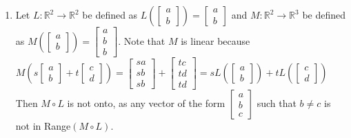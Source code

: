 \documentclass[10pt,english]{article}
\begin{document}
\begin{enumerate}
\begin{enumerate}
    \item Let $L:\mathbb{R}^2\rightarrow\mathbb{R}^2$ be defined as $L\left(\begin{bmatrix}a\\b\end{bmatrix}\right)=\begin{bmatrix}a\\b\end{bmatrix}$ and $M:\mathbb{R}^2\rightarrow\mathbb{R}^3$ be defined as $M\left(\begin{bmatrix}a\\b\end{bmatrix}\right)=\begin{bmatrix}a\\b\\b\end{bmatrix}$. 
    Note that $M$ is linear because $M\left(s\begin{bmatrix}a\\b\end{bmatrix}+t\begin{bmatrix}c\\d\end{bmatrix}\right)=\begin{bmatrix}sa\\sb\\sb\end{bmatrix}+\begin{bmatrix}tc\\td\\td\end{bmatrix}=sL\left(\begin{bmatrix}a\\b\end{bmatrix}\right)+tL\left(\begin{bmatrix}c\\d\end{bmatrix}\right)$
    Then $M\circ L$ is not onto, as any vector of the form $\begin{bmatrix}a\\b\\c\end{bmatrix}$ such that $b\neq c$ is not in Range$(M\circ L)$. 
\end{enumerate}




\end{enumerate}
\end{document}
